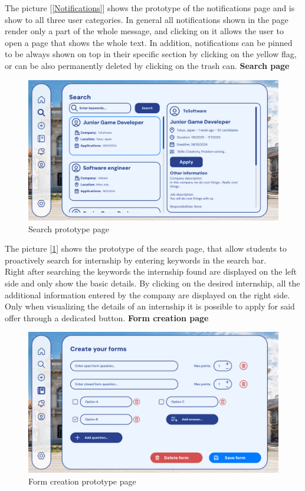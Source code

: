 \documentclass[11pt,twoside]{article}
\begin{document}
The picture [\ref{Notifications}] shows the prototype of the notifications page and is show to all three user categories. In general all notifications shown in the page render only a part of the whole message, and clicking on it allows the user to open a page that shows the whole text. In addition, notifications can be pinned to be always shown on top in their specific section by clicking on the yellow flag, or can be also permanently deleted by clicking on the trash can.
\newpage
\large{\textbf{Search page}}\\
\begin{figure}[H]
\includegraphics[width=\textwidth]{Images/Search}
\caption{Search prototype page}\label{Search}
\end{figure}
The picture [\ref{Search}] shows the prototype of the search page, that allow students to proactively search for internship by entering keywords in the search bar.\\
Right after searching the keywords the internship found are displayed on the left side and only show the basic details. By clicking on the desired internship, all the additional information entered by the company are displayed on the right side. Only when visualizing the details of an internship it is possible to apply for said offer through a dedicated button.
\newpage
\large{\textbf{Form creation page}}\\
\begin{figure}[H]
\includegraphics[width=\textwidth]{Images/Create form}
\caption{Form creation prototype page}\label{Form}
\end{figure}
\end{document}
